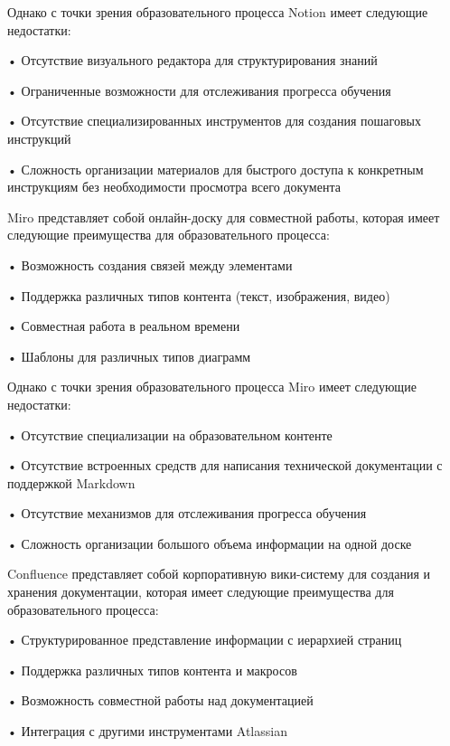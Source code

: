 {  \par \redline Однако с точки зрения образовательного процесса Notion имеет следующие недостатки:
  
  \par \redline • Отсутствие визуального редактора для структурирования знаний
  \par \redline • Ограниченные возможности для отслеживания прогресса обучения
  \par \redline • Отсутствие специализированных инструментов для создания пошаговых инструкций
  \par \redline • Сложность организации материалов для быстрого доступа к конкретным инструкциям без необходимости просмотра всего документа

  \par \redline Miro представляет собой онлайн-доску для совместной работы, которая имеет следующие преимущества для образовательного процесса:
  
  \par \redline • Возможность создания связей между элементами
  \par \redline • Поддержка различных типов контента (текст, изображения, видео)
  \par \redline • Совместная работа в реальном времени
  \par \redline • Шаблоны для различных типов диаграмм
  
  \par \redline Однако с точки зрения образовательного процесса Miro имеет следующие недостатки:
  
  \par \redline • Отсутствие специализации на образовательном контенте
  \par \redline • Отсутствие встроенных средств для написания технической документации с поддержкой Markdown
  \par \redline • Отсутствие механизмов для отслеживания прогресса обучения
  \par \redline • Сложность организации большого объема информации на одной доске

  \par \redline Confluence представляет собой корпоративную вики-систему для создания и хранения документации, которая имеет следующие преимущества для образовательного процесса:
  
  \par \redline • Структурированное представление информации с иерархией страниц
  \par \redline • Поддержка различных типов контента и макросов
  \par \redline • Возможность совместной работы над документацией
  \par \redline • Интеграция с другими инструментами Atlassian
  
}
